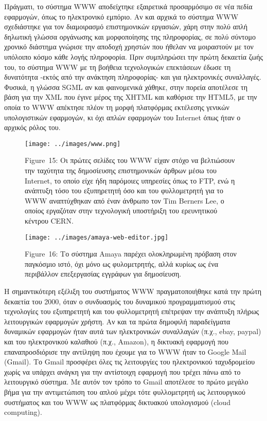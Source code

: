 \documentclass[
]{article}
\begin{document}
Πράγματι, το σύστημα WWW αποδείχτηκε εξαιρετικά προσαρμόσιμο σε νέα
πεδία εφαρμογών, όπως το ηλεκτρονικό εμπόριο. Αν και αρχικά το σύστημα
WWW σχεδιάστηκε για τον διαμοιρασμό επιστημονικών εργασιών, χάρη στην
πολύ απλή δηλωτική γλώσσα οργάνωσης και μορφοποίησης της πληροφορίας, σε
πολύ σύντομο χρονικό διάστημα γνώρισε την αποδοχή χρηστών που ήθελαν να
μοιραστούν με τον υπόλοιπο κόσμο κάθε λογής πληροφορία. Πριν συμπληρώσει
την πρώτη δεκαετία ζωής του, το σύστημα WWW με τη βοήθεια τεχνολογικών
επεκτάσεων έδωσε τη δυνατότητα -εκτός από την ανάκτηση πληροφορίας- και
για ηλεκτρονικές συναλλαγές. Φυσικά, η γλώσσα SGML αν και φαινομενικά
χάθηκε, στην πορεία αποτέλεσε τη βάση για την XML που έγινε μέρος της
XHTML και καθόρισε την HTML5, με την οποία το WWW απέκτησε πλέον τη
μορφή πλατφόρμας εκτέλεσης γενικών υπολογιστικών εφαρμογών, κι όχι απλών
εφαρμογών του Internet όπως ήταν ο αρχικός ρόλος του.

\leavevmode{}%
\begin{figure}
\hypertarget{fig:www}{%
\centering
\texttt{[image: ../images/www.png]}
\caption{Figure~15: Οι πρώτες σελίδες του WWW είχαν στόχο να βελτιώσουν
την ταχύτητα της δημοσίευσης επιστημονικών άρθρων μέσω του Internet, το
οποίο είχε ήδη παρόμοιες υπηρεσίες όπως το FTP, ενώ η ανάπτυξη τόσο του
εξυπηρετητή όσο και του φυλλομετρητή για το WWW αναπτύχθηκαν από έναν
άνθρωπο τον Tim Berners Lee, ο οποίος εργαζόταν στην τεχνολογική
υποστήριξη του ερευνητικού κέντρου CERN.}\label{fig:www}
}
\end{figure}

\leavevmode{}%
\begin{figure}
\hypertarget{fig:amaya-web-editor}{%
\centering
\texttt{[image: ../images/amaya-web-editor.jpg]}
\caption{Figure~16: Το σύστημα Amaya παρέχει ολοκληρωμένη πρόβαση στον
παγκόσμιο ιστό, όχι μόνο ως φυλομετρητής, αλλά κυρίως ως ένα περιβάλλον
επεξεργασίας εγγράφων για δημοσίευση.}\label{fig:amaya-web-editor}
}
\end{figure}

Η σημαντικότερη εξέλιξη του συστήματος WWW πραγματοποιήθηκε κατά την
πρώτη δεκαετία του 2000, όταν ο συνδυασμός του δυναμικού προγραμματισμού
στις τεχνολογίες του εξυπηρετητή και του φυλλομετρητή επέτρεψαν την
ανάπτυξη πλήρως λειτουργικών εφαρμογών χρήστη. Αν και τα πρώτα δημοφιλή
παραδείγματα δυναμικών εφαρμογών ήταν αυτά των ηλεκτρονικών συναλλαγών
(π.χ., ebay, paypal) και του ηλεκτρονικού καλαθιού (π.χ., Amazon), η
δικτυακή εφαρμογή που επαναπροσδιόρισε την αντίληψη που έχουμε για το
WWW ήταν το Google Mail (Gmail). Το Gmail προσφέρει όλες τις λειτουργίες
του ηλεκτρονικού ταχυδρομείου χωρίς να υπάρχει ανάγκη για την αντίστοιχη
εφαρμογή που τρέχει πάνω από το λειτουργικό σύστημα. Με αυτόν τον τρόπο
το Gmail αποτέλεσε το πρώτο μεγάλο βήμα για την αντιμετώπιση του απλού
μέχρι τότε φυλλομετρητή ως λειτουργικού συστήματος και του WWW ως
πλατφόρμας δικτυακού υπολογισμού (cloud computing).
\end{document}
